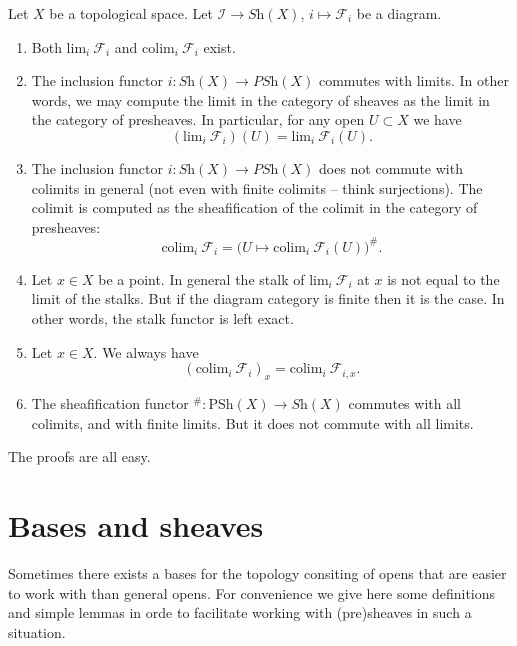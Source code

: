 \noindent
Let $X$ be a topological space.
Let $\mathcal{I} \to \textit{Sh}(X)$, $i \mapsto \mathcal{F}_i$
be a diagram.
\begin{enumerate}
\item Both $\text{lim}_i\ \mathcal{F}_i$ and $\text{colim}_i\ \mathcal{F}_i$
exist.
\item The inclusion functor $i : \textit{Sh}(X) \to \textit{PSh}(X)$
commutes with limits. In other words, we may compute the limit
in the category of sheaves as the limit in the category of
presheaves. In particular, for any open $U \subset X$ we have
$$
(\text{lim}_i\ \mathcal{F}_i)(U) = \text{lim}_i\ \mathcal{F}_i(U).
$$
\item The inclusion functor $i : \textit{Sh}(X) \to \textit{PSh}(X)$
does not commute with colimits in general (not even
with finite colimits -- think surjections). The colimit is
computed as the sheafification of the colimit in the
category of presheaves:
$$
\text{colim}_i\ \mathcal{F}_i =
\Big(U \mapsto \text{colim}_i\ \mathcal{F}_i(U)\Big)^\#.
$$
\item Let $x \in X$ be a point. In general the stalk of
$\text{lim}_i\ \mathcal{F}_i$ at $x$ is not equal to
the limit of the stalks. But if the diagram category is finite
then it is the case. In other words, the stalk functor is
left exact.
\item Let $x \in X$. We always have
$$
(\text{colim}_i\ \mathcal{F}_i)_x = \text{colim}_i\ \mathcal{F}_{i,x}.
$$
\item The sheafification functor
${}^\# : \text{PSh}(X) \to \textit{Sh}(X)$ commutes with all
colimits, and with finite limits. But it does not commute
with all limits.
\end{enumerate}
The proofs are all easy.


\section{Bases and sheaves}
\label{section-bases}

\noindent
Sometimes there exists a bases for the topology
consiting of opens that are easier to work with
than general opens. For convenience we give here
some definitions and simple lemmas in orde to
facilitate working with (pre)sheaves in such a situation.

